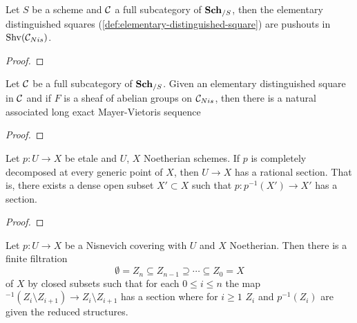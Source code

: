 \documentclass[12pt]{article}
\numberwithin{equation}{section}
\numberwithin{lemma}{section}
\numberwithin{theorem}{section}
\numberwithin{proposition}{section}
\numberwithin{corollary}{section}
\numberwithin{definition}{section}
\numberwithin{example}{section}
\numberwithin{remark}{section}
\begin{document}

\begin{proposition}
  Let $S$ be a scheme and $\mathcal{C}$ a full subcategory of $\mathbf{Sch}_{/S}$,
  then the elementary distinguished squares
  (\ref{def:elementary-distinguished-square}) are pushouts in
  $\operatorname{Shv}(\mathcal{C}_{Nis})$.
\end{proposition}

\begin{proof}
\end{proof}

\begin{corollary}
  Let $\mathcal{C}$ be a full subcategory of $\mathbf{Sch}_{/S}$. Given an elementary
  distinguished square in $\mathcal{C}$ and if $F$ is a sheaf of abelian
  groups on $\mathcal{C}_{Nis}$, then there is a natural associated long exact
  Mayer-Vietoris sequence
\end{corollary}

\begin{proof}
\end{proof}

\begin{lemma}
  Let $p : U \to X$ be etale and $U$, $X$ Noetherian schemes. If $p$
  is completely decomposed at every generic point of $X$, then
  $U \to X$ has a rational section. That is, there exists a dense open
  subset $X' \subset X$ such that $p : p^{-1}(X') \to X'$ has a section.
\end{lemma}

\begin{proof}
\end{proof}

\begin{proposition}
  Let $p : U \to X$ be a Nisnevich covering with $U$ and $X$
  Noetherian. Then there is a finite filtration
  \begin{equation*}
    \emptyset = Z_n \subseteq Z_{n-1} \supseteq \cdots \subseteq Z_0 = X
  \end{equation*}
  of $X$ by closed subsets such that for each $0 \leq i \leq n$ the
  map $^{-1}(Z_i \setminus Z_{i+1}) \to Z_i \setminus Z_{i+1}$ has a
  section where for $i \geq 1$ $Z_i$ and $p^{-1}(Z_i)$ are given the
  reduced structures.
\end{proposition}
\end{document}
